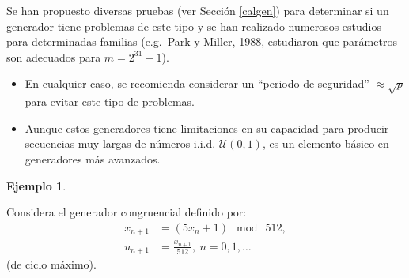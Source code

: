 \documentclass[
]{book}
\theoremstyle{break}
\theoremstyle{definition}
\theoremstyle{definition}
\newtheorem{example}{Ejemplo}[chapter]
\theoremstyle{definition}
\theoremstyle{definition}
\theoremstyle{remark}
\begin{document}
Se han propuesto diversas pruebas (ver Sección \ref{calgen}) para
determinar si un generador tiene problemas de este tipo y se han
realizado numerosos estudios para determinadas familias (e.g.~Park y
Miller, 1988, estudiaron que parámetros son adecuados para \(m=2^{31}-1\)).

\begin{itemize}
\item
  En cualquier caso, se recomienda considerar un ``periodo de
  seguridad'' \(\approx \sqrt{p}\) para evitar este tipo de problemas.
\item
  Aunque estos generadores tiene limitaciones en su capacidad para
  producir secuencias muy largas de números i.i.d. \(\mathcal{U}(0,1)\),
  es un elemento básico en generadores más avanzados.
\end{itemize}

\begin{example}
\protect\hypertarget{exm:congru512}{}{\label{exm:congru512} }
\end{example}

Considera el generador congruencial definido por:
\[\begin{aligned}
x_{n+1}  & =(5x_{n}+1)\ \bmod\ 512,\nonumber\\
u_{n+1}  & =\frac{x_{n+1}}{512},\ n=0,1,\dots\nonumber
\end{aligned}\]
(de ciclo máximo).
\end{document}
